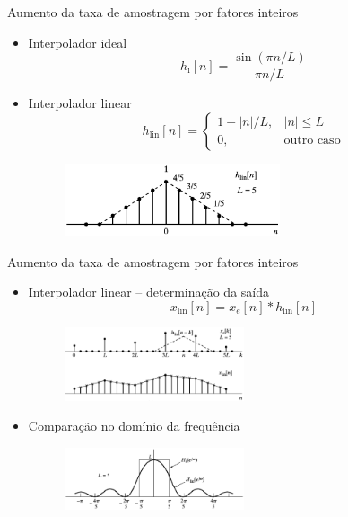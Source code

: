 \documentclass[
size=11pt,
paper=screen,
mode=present,
display=slidesnotes,
style=paintings,
nopagebreaks,
blackslide,
fleqn]{powerdot}
\begin{document}
\begin{slide}{Aumento da taxa de amostragem por fatores inteiros }
	\begin{itemize}
		\item Interpolador ideal
			\begin{equation*}
				h_\text{i}[n] = \frac{\sin (\pi n/L)}{\pi n/L}
			\end{equation*}
		\item Interpolador linear
			\begin{equation*}
				h_\text{lin}[n] = \begin{cases} 1-|n|/L, & |n|\leq L\\ 0, & \text{outro caso} \end{cases}
			\end{equation*}
			\begin{figure}
				\centering
				\includegraphics[width=0.6\textwidth]{figs/4-25.eps}
		        \end{figure}
	\end{itemize}
\end{slide}
\begin{slide}{Aumento da taxa de amostragem por fatores inteiros }
	\begin{itemize}
		\item Interpolador linear -- determinação da saída
			\begin{equation*}
				x_\text{lin}[n]=x_e[n]*h_\text{lin}[n]
			\end{equation*}
			\begin{figure}
				\centering
				\includegraphics[width=0.5\textwidth]{figs/4-26a.eps}
		        \end{figure}
		\item Comparação no domínio da frequência 
			\begin{figure}
				\centering
				\includegraphics[width=0.5\textwidth]{figs/4-26b.eps}
		        \end{figure}
	\end{itemize}
\end{slide}
\end{document}
